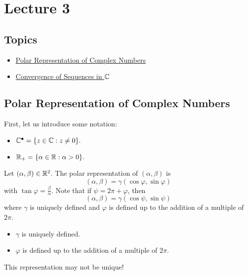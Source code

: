 \documentclass[a4paper]{report}
\begin{document}
\section{Lecture 3}

\subsection{Topics}

\begin{itemize}
    \item {\hyperref[Polar Representation of Complex Numbers]{Polar Representation of Complex Numbers}} 
    \item {\hyperref[Convergence of Sequences in the Complex Numbers]{Convergence of Sequences in \( \mathbb{C} \)}} 
\end{itemize}

\subsection{Polar Representation of Complex Numbers}\label{Polar Representation of Complex Numbers}

First, let us introduce some notation:
\begin{itemize}
    \item \( \mathbb{C}^{\bullet} = \{ z \in \mathbb{C} : z \neq 0  \}. \)
    \item \( {\mathbb{R}}_{+} = \{ \alpha \in \mathbb{R} : \alpha > 0  \}. \)
\end{itemize}

\begin{definition}
   Let \( (\alpha , \beta) \in \mathbb{R}^{2}  \). The polar representation of \( (\alpha, \beta) \) is 
   \[  (\alpha, \beta) = \gamma (\cos \varphi, \sin \varphi) \]
   with \( \tan \varphi = \frac{ \beta }{ \alpha }  \). Note that if \( \psi = 2 \pi + \varphi \), then
   \[  (\alpha, \beta) = \gamma (\cos \psi, \sin \psi) \]
   where \( \gamma  \) is uniquely defined and \( \varphi  \) is defined up to the addition of a multiple of \( 2 \pi \).
\end{definition}

\begin{itemize}
    \item \( \gamma  \) is uniquely defined. 
    \item \( \varphi  \) is defined up to the addition of a multiple of \( 2 \pi  \).
\end{itemize}


\begin{remark}
    This representation may not be unique!
\end{remark}
\end{document}
